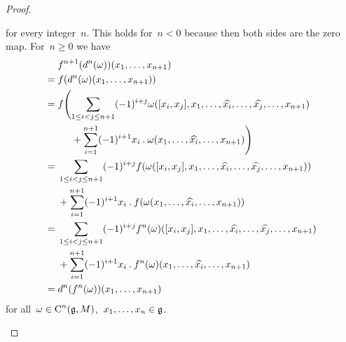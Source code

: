 \begin{proof}
\begin{enumerate}
      for every integer~$n$.
      This holds for~$n < 0$ because then both sides are the zero map.
      For~$n \geq 0$ we have
      \begin{align*}
        {}&
        f^{n+1}( d^n(\omega) )(x_1, \dotsc, x_{n+1})
        \\
        ={}&
        f( d^n(\omega)(x_1, \dotsc, x_{n+1}) )
        \\
        ={}&
        f
        \Biggl(
          \sum_{1 \leq i < j \leq n+1}
          (-1)^{i+j}
          \omega( [x_i, x_j], x_1, \dotsc, \widehat{x_i}, \dotsc, \widehat{x_j}, \dotsc, x_{n+1} )
        \\
        {}&
        \phantom{
          f
          \Biggl(
        }
          +
          \sum_{i=1}^{n+1}
          (-1)^{i+1}
          x_i \mathbin{.} \omega(x_1, \dotsc, \widehat{x_i}, \dotsc, x_{n+1})
        \Biggr)
        \\
        ={}&
        \sum_{1 \leq i < j \leq n+1}
        (-1)^{i+j}
        f( \omega( [x_i, x_j], x_1, \dotsc, \widehat{x_i}, \dotsc, \widehat{x_j}, \dotsc, x_{n+1} ) )
        \\
        {}&
        +
        \sum_{i=1}^{n+1}
        (-1)^{i+1}
        x_i \mathbin{.} f( \omega(x_1, \dotsc, \widehat{x_i}, \dotsc, x_{n+1}) )
        \\
        ={}&
        \sum_{1 \leq i < j \leq n+1}
        (-1)^{i+j}
        f^n(\omega)( [x_i, x_j], x_1, \dotsc, \widehat{x_i}, \dotsc, \widehat{x_j}, \dotsc, x_{n+1} )
        \\
        {}&
        +
        \sum_{i=1}^{n+1}
        (-1)^{i+1}
        x_i \mathbin{.} f^n(\omega)(x_1, \dotsc, \widehat{x_i}, \dotsc, x_{n+1})
        \\
        ={}&
        d^n( f^n(\omega) )(x_1, \dotsc, x_{n+1})
      \end{align*}
      for all~$\omega \in \operatorname{C}^n(\mathfrak{g}, M)$,~$x_1, \dotsc, x_n \in \mathfrak{g}$.
    \qedhere
  \end{enumerate}
\end{proof}


